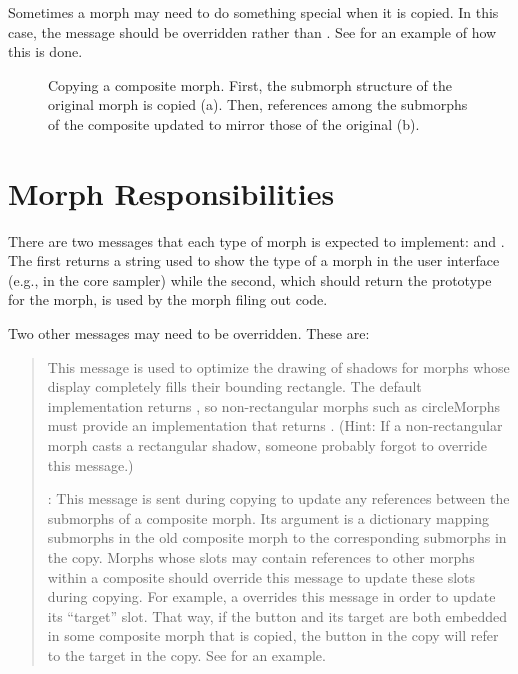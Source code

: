 \documentclass[letterpaper,10pt,english]{sphinxmanual}
\begin{document}
Sometimes a morph may need to do something special when it is copied. In this case, the message  should be overridden rather than . See  for an example of how this is done.
\begin{figure}[htbp]
\centering
\capstart

\noindent{}
\caption{Copying a composite morph. First, the submorph structure of the original morph is copied (a). Then, references among the submorphs of the composite updated to mirror those of the original (b).}\label{\detokenize{morphic:figcopyingcomposite16}}\label{\detokenize{morphic:id18}}\end{figure}
\newpage

\section{Morph Responsibilities}
\label{\detokenize{morphic:morph-responsibilities}}
There are two messages that each type of morph is expected to implement:  and . The first returns a string used to show the type of a morph in the user interface (e.g., in the core sampler) while the second, which should return the prototype for the morph, is used by the morph filing out code.

Two other messages may need to be overridden. These are:
\begin{quote}

 This message is used to optimize the drawing of shadows for morphs whose display completely fills their bounding rectangle. The default implementation returns , so non-rectangular morphs such as circleMorphs must provide an implementation that returns . (Hint: If a non-rectangular morph casts a rectangular shadow, someone probably forgot to override this message.)

: This message is sent during copying to update any references between the submorphs of a composite morph. Its argument is a dictionary mapping submorphs in the old composite morph to the corresponding submorphs in the copy. Morphs whose slots may contain references to other morphs within a composite should override this message to update these slots during copying. For example, a  overrides this message in order to update its “target” slot. That way, if the button and its target are both embedded in some composite morph that is copied, the button in the copy will refer to the target in the copy. See  for an example.
\end{quote}
\end{document}

